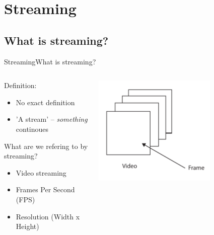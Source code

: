 \author{Thomas K. Panum}
\section{Streaming}
\subsection{What is streaming?}
\begin{frame}{Streaming}{What is streaming?}
  \begin{columns}[T]
    \begin{column}{.6\textwidth}
     \begin{block}{}
    Definition:
    \begin{itemize}
      \item No exact definition
      \item 'A stream' -- \textit{something} continoues
    \end{itemize}
    What are we refering to by streaming?
    \begin{itemize}
      \item Video streaming
      \item Frames Per Second (FPS)
      \item Resolution (Width x Height)
    \end{itemize}
    \end{block}
    \end{column}
    \begin{column}{.4\textwidth}
      \begin{block}{}
        \begin{center}
          \includegraphics[width=0.7\textwidth]{images/video_structure.pdf}
        \end{center}
      \end{block}
    \end{column}
  \end{columns}
\end{frame}

